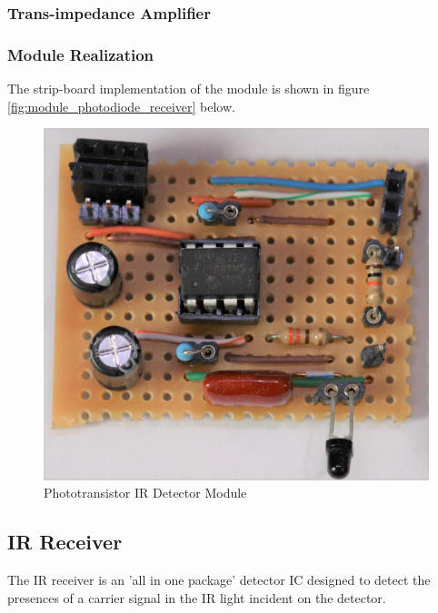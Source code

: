 \subsubsection{Trans-impedance Amplifier}


\subsubsection{Module Realization}
The strip-board implementation of the module is shown in figure \ref{fig:module_photodiode_receiver} below.

\begin{figure}[H]
	\centering
	\includegraphics[width=.6\textwidth]{figures/modules/phototransistor_receiver.jpg}
	\caption{Phototransistor IR Detector Module}
	\label{fig:module_phototransistor_detector}
\end{figure}








\subsection{IR Receiver}

The IR receiver is an 'all in one package' detector IC designed to detect the presences of a carrier signal in the IR light incident on the detector.


